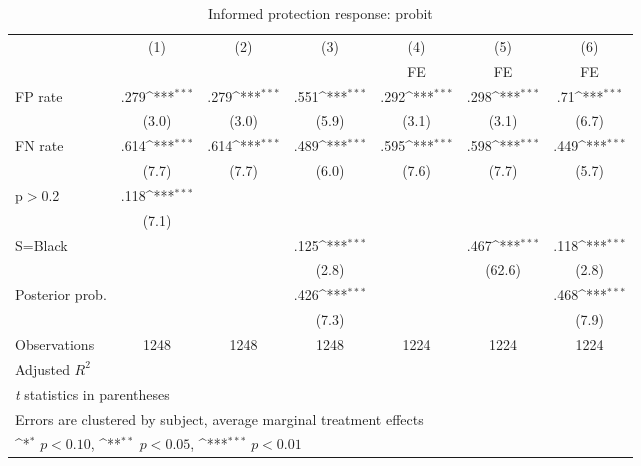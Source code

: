 \begin{table}[htbp]\centering
\def\sym#1{\ifmmode^{#1}\else\(^{#1}\)\fi}
\caption{Informed protection response: probit}
\begin{tabular}{l*{6}{c}}
\hline\hline
                &\multicolumn{1}{c}{(1)}&\multicolumn{1}{c}{(2)}&\multicolumn{1}{c}{(3)}&\multicolumn{1}{c}{(4)}&\multicolumn{1}{c}{(5)}&\multicolumn{1}{c}{(6)}\\
                &\multicolumn{1}{c}{}&\multicolumn{1}{c}{}&\multicolumn{1}{c}{}&\multicolumn{1}{c}{FE}&\multicolumn{1}{c}{FE}&\multicolumn{1}{c}{FE}\\
\hline
FP rate         &     .279\sym{***}&     .279\sym{***}&     .551\sym{***}&     .292\sym{***}&     .298\sym{***}&      .71\sym{***}\\
                &    (3.0)         &    (3.0)         &    (5.9)         &    (3.1)         &    (3.1)         &    (6.7)         \\
FN rate         &     .614\sym{***}&     .614\sym{***}&     .489\sym{***}&     .595\sym{***}&     .598\sym{***}&     .449\sym{***}\\
                &    (7.7)         &    (7.7)         &    (6.0)         &    (7.6)         &    (7.7)         &    (5.7)         \\
p$>$0.2         &     .118\sym{***}&                  &                  &                  &                  &                  \\
                &    (7.1)         &                  &                  &                  &                  &                  \\
S=Black         &                  &                  &     .125\sym{***}&                  &     .467\sym{***}&     .118\sym{***}\\
                &                  &                  &    (2.8)         &                  &   (62.6)         &    (2.8)         \\
Posterior prob. &                  &                  &     .426\sym{***}&                  &                  &     .468\sym{***}\\
                &                  &                  &    (7.3)         &                  &                  &    (7.9)         \\
\hline
Observations    &     1248         &     1248         &     1248         &     1224         &     1224         &     1224         \\
Adjusted \(R^{2}\)&                  &                  &                  &                  &                  &                  \\
\hline\hline
\multicolumn{7}{l}{\footnotesize \textit{t} statistics in parentheses}\\
\multicolumn{7}{l}{\footnotesize Errors are clustered by subject, average marginal treatment effects}\\
\multicolumn{7}{l}{\footnotesize \sym{*} \(p<0.10\), \sym{**} \(p<0.05\), \sym{***} \(p<0.01\)}\\
\end{tabular}
\end{table}

